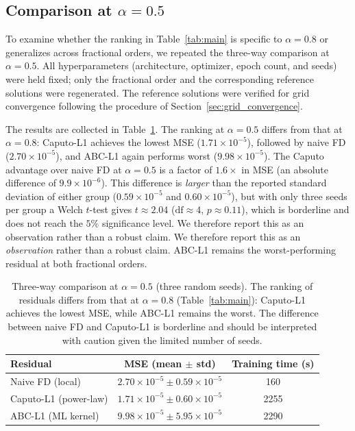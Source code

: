 \documentclass[11pt]{article}
\begin{document}
\subsection{Comparison at \(\alpha = 0.5\)}
\label{sec:alpha05}

To examine whether the ranking in Table~\ref{tab:main} is specific to
\(\alpha = 0.8\) or generalizes across fractional orders, we repeated
the three-way comparison at \(\alpha = 0.5\). All hyperparameters
(architecture, optimizer, epoch count, and seeds) were held fixed; only
the fractional order and the corresponding reference solutions were
regenerated. The reference solutions were verified for grid
convergence following the procedure of
Section~\ref{sec:grid_convergence}.

The results are collected in Table~\ref{tab:alpha05}. The ranking
at \(\alpha = 0.5\) differs from that at \(\alpha = 0.8\):
Caputo-L1 achieves the lowest MSE (\(1.71\times 10^{-5}\)),
followed by naive FD (\(2.70\times 10^{-5}\)), and ABC-L1 again
performs worst (\(9.98\times 10^{-5}\)). The Caputo advantage over
naive FD at \(\alpha=0.5\) is a factor of \(1.6\times\) in MSE (an
absolute difference of \(9.9\times 10^{-6}\)). This difference is
\emph{larger} than the reported standard deviation of either group
(\(0.59\times 10^{-5}\) and \(0.60\times 10^{-5}\)), but with only
three seeds per group a Welch \(t\)-test gives
\(t \approx 2.04\) (\(\mathrm{df} \approx 4\), \(p \approx 0.11\)),
which is borderline and does not reach the \(5\%\) significance
level. We therefore report this as an observation rather than a
robust claim. We therefore report
this as an \emph{observation} rather than a robust claim. ABC-L1
remains the worst-performing residual at both fractional orders.

\begin{table}[h]
\centering
\caption{Three-way comparison at \(\alpha = 0.5\) (three random
         seeds). The ranking of residuals differs from that at
         \(\alpha = 0.8\) (Table~\ref{tab:main}): Caputo-L1 achieves
         the lowest MSE, while ABC-L1 remains the worst. The difference
         between naive FD and Caputo-L1 is borderline and should be
         interpreted with caution given the limited number of seeds.}
\label{tab:alpha05}
\begin{tabular}{lcc}
\toprule
Residual & MSE (mean \(\pm\) std) & Training time (s) \\
\midrule
Naive FD (local)   & \(2.70\times 10^{-5} \pm 0.59\times 10^{-5}\) & 160 \\
Caputo-L1 (power-law) & \(1.71\times 10^{-5} \pm 0.60\times 10^{-5}\) & 2255 \\
ABC-L1 (ML kernel) & \(9.98\times 10^{-5} \pm 5.95\times 10^{-5}\) & 2290 \\
\bottomrule
\end{tabular}
\end{table}
\end{document}
